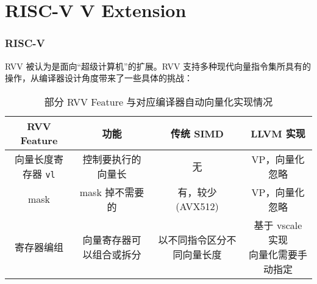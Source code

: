 \documentclass[aspectratio=169]{ctexbeamer}
\begin{document}
\section{RISC-V V Extension}

\begin{frame}
    \frametitle{RISC-V}

    RVV 被认为是面向``超级计算机''的扩展。RVV 支持多种现代向量指令集所具有的操作，从编译器设计角度带来了一些具体的挑战：

    \begin{table}
        \scriptsize
        \centering
        \caption{部分 RVV Feature 与对应编译器自动向量化实现情况}
        \begin{tabular}{cccc}
            \toprule
            RVV Feature         & 功能           & 传统 SIMD       & LLVM 实现             \\
            \midrule
            向量长度寄存器 \texttt{vl} & 控制要执行的向量长    & 无             & VP，向量化忽略            \\
            mask                & mask 掉不需要的   & 有，较少 (AVX512) & VP，向量化忽略            \\
            寄存器编组               & 向量寄存器可以组合或拆分 & 以不同指令区分不同向量长度 & \thead{基于 vscale 实现 \\ 向量化需要手动指定} \\
            \bottomrule
        \end{tabular}
    \end{table}

\end{frame}
\end{document}
